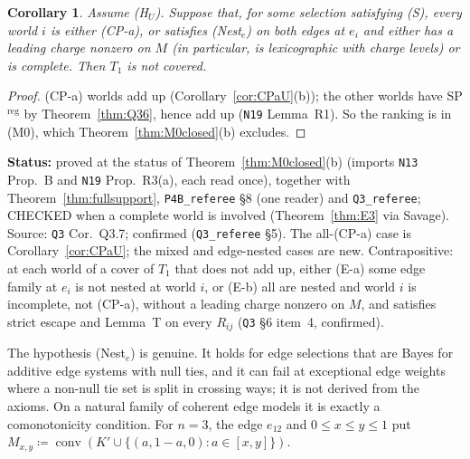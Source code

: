 \documentclass[11pt]{article}
\newtheorem{corollary}[theorem]{Corollary}
\theoremstyle{definition}
\theoremstyle{remark}
\newcommand{\co}{\operatorname{conv}}
\newcommand{\src}[1]{\texttt{#1}}
\newcommand{\status}[1]{\par\smallskip\noindent\textbf{Status:} #1\par\smallskip}
\begin{document}
\begin{corollary}\label{cor:Q37}
Assume (H$_U$). Suppose that, for some selection satisfying (S), every world $i$ is either (CP-a), or satisfies (Nest$_e$) on both edges at $e_i$ and either has a leading charge nonzero on $M$ (in particular, is lexicographic with charge levels) or is complete. Then $T_1$ is not covered.
\end{corollary}
\begin{proof}
(CP-a) worlds add up (Corollary~\ref{cor:CPaU}(b)); the other worlds have SP$^{\mathrm{reg}}$ by Theorem~\ref{thm:Q36}, hence add up (\src{N19} Lemma~R1). So the ranking is in (M0), which Theorem~\ref{thm:M0closed}(b) excludes.
\end{proof}
\status{proved at the status of Theorem~\ref{thm:M0closed}(b) (imports \src{N13} Prop.~B and \src{N19} Prop.~R3(a), each read once), together with Theorem~\ref{thm:fullsupport}, \src{P4B\_referee} \S8 (one reader) and \src{Q3\_referee}; CHECKED when a complete world is involved (Theorem~\ref{thm:E3} via Savage). Source: \src{Q3} Cor.~Q3.7; confirmed (\src{Q3\_referee} \S5). The all-(CP-a) case is Corollary~\ref{cor:CPaU}; the mixed and edge-nested cases are new. Contrapositive: at each world of a cover of $T_1$ that does not add up, either (E-a) some edge family at $e_i$ is not nested at world $i$, or (E-b) all are nested and world $i$ is incomplete, not (CP-a), without a leading charge nonzero on $M$, and satisfies strict escape and Lemma~T on every $R_{ij}$ (\src{Q3} \S6 item~4, confirmed).}

The hypothesis (Nest$_e$) is genuine. It holds for edge selections that are Bayes for additive edge systems with null ties, and it can fail at exceptional edge weights where a non-null tie set is split in crossing ways; it is not derived from the axioms. On a natural family of coherent edge models it is exactly a comonotonicity condition. For $n=3$, the edge $e_{12}$ and $0\le x\le y\le1$ put $M_{x,y}\coloneqq\co(K'\cup\{(a,1-a,0):a\in[x,y]\})$.
\end{document}
